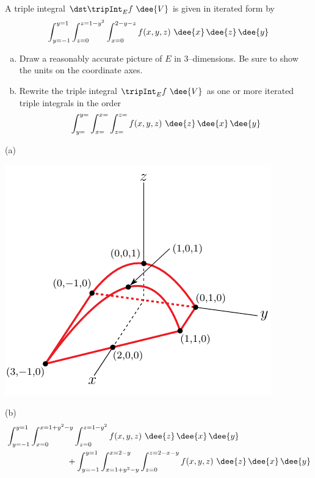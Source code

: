 \begin{question}[M200 2005D] %
A triple integral $\dst\tripInt_E f\ \dee{V}$ is given in 
iterated form by
\begin{equation*}
\int_{y=-1}^{y=1} \int_{z=0}^{z=1-y^2} \int_{x=0}^{2-y-z} f(x,y,z)
                                    \ \dee{x}\,\dee{z}\,\dee{y}
\end{equation*}
\begin{enumerate}[(a)]
\item
Draw a reasonably accurate picture of $E$ in 3--dimensions. Be sure 
to show the units on the coordinate axes.
\item
Rewrite the triple integral $\tripInt_E f\ \dee{V}$ as one or more 
iterated triple integrals in the order
\begin{equation*}
\int_{y=}^{y=} \int_{x=}^{x=} \int_{z=}^{z=} f(x,y,z)
                                    \ \dee{z}\,\dee{x}\,\dee{y}
\end{equation*}
\end{enumerate}
\end{question}

%

\begin{answer}
(a)
\begin{center}
     \includegraphics{fig/OE05D_9c.pdf}
\end{center}

(b)
\begin{align*}
&\int_{y=-1}^{y=1} \int_{x=0}^{x=1+y^2-y} \int_{z=0}^{z=1-y^2} f(x,y,z)
                                    \ \dee{z}\,\dee{x}\,\dee{y} \\
&\hskip1in
+\int_{y=-1}^{y=1} \int_{x=1+y^2-y}^{x=2-y} \int_{z=0}^{z=2-x-y} f(x,y,z)
                                    \ \dee{z}\,\dee{x}\,\dee{y}
\end{align*}
\end{answer}

